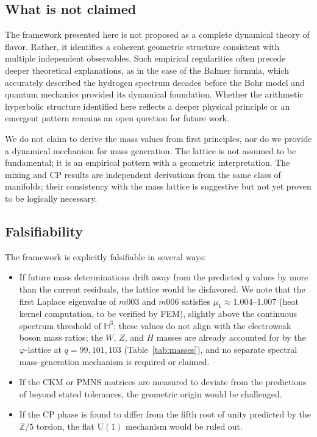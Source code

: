 ﻿\documentclass[12pt]{article}
\theoremstyle{definition}
\begin{document}
\subsection{What is not claimed}

The framework presented here is not proposed as a complete dynamical theory of flavor. Rather, it identifies a coherent geometric structure consistent with multiple independent observables. Such empirical regularities often precede deeper theoretical explanations, as in the case of the Balmer formula, which accurately described the hydrogen spectrum decades before the Bohr model and quantum mechanics provided its dynamical foundation. Whether the arithmetic hyperbolic structure identified here reflects a deeper physical principle or an emergent pattern remains an open question for future work.

We do not claim to derive the mass values from first principles, nor do we provide a dynamical mechanism for mass generation. The lattice is not assumed to be fundamental; it is an empirical pattern with a geometric interpretation. The mixing and CP results are independent derivations from the same class of manifolds; their consistency with the mass lattice is suggestive but not yet proven to be logically necessary.

\subsection{Falsifiability}
The framework is explicitly falsifiable in several ways:
\begin{itemize}
\item If future mass determinations drift away from the predicted $q$ values by more than the current residuals, the lattice would be disfavored. We note that the first Laplace eigenvalue of $m003$ and $m006$ satisfies $\mu_1 \approx 1.004$--$1.007$ (heat kernel computation, to be verified by FEM), slightly above the continuous spectrum threshold of $\mathbb{H}^3$; these values do not align with the electroweak boson mass ratios; the $W$, $Z$, and $H$ masses are already accounted for by the $\varphi$-lattice at $q=99,101,103$ (Table~\ref{tab:masses}), and no separate spectral mass-generation mechanism is required or claimed.
\item If the CKM or PMNS matrices are measured to deviate from the predictions of \cite{Gentry:CKM,Gentry:PMNS} beyond stated tolerances, the geometric origin would be challenged.
\item If the CP phase is found to differ from the fifth root of unity predicted by the $\mathbb{Z}/5$ torsion, the flat $\mathrm{U}(1)$ mechanism would be ruled out.
\end{itemize}
\end{document}
